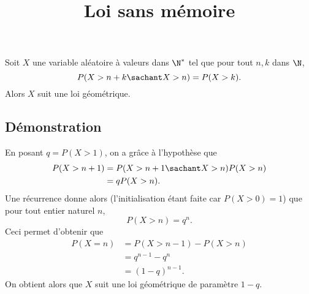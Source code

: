 \documentclass[fontsize=12pt,twoside=false,parskip=half, french]{scrartcl}
\title{Loi sans mémoire}
\date{}
\author{}
\begin{document}
\maketitle
   \begin{Theoreme}
      Soit $X$ une variable aléatoire à valeurs dans $\N^*$ tel que pour 
      tout $n, k$ dans $\N$,
      \[
         P(X > n + k \sachant X > n) = P(X > k).
      \]
      Alors $X$ suit une loi géométrique.
   \end{Theoreme}
   \subsection{Démonstration}
      En posant $q = P(X > 1)$, on a grâce à l’hypothèse que
      \begin{align*}
         P(X > n + 1) &= P(X > n + 1 \sachant X > n)P(X > n)\\ 
                      &= qP(X > n).
      \end{align*}
      Une récurrence donne alors (l’initialisation étant faite car 
      $P(X > 0) = 1$) que pour tout entier naturel $n$,
      \[
         P(X > n) = q^n.
      \]
      Ceci permet d’obtenir que
      \begin{align*}
         P(X = n) &= P(X > n - 1) - P(X > n)\\ 
                  &= q^{n -1} - q^n\\
                  &= (1 - q)^{n - 1}.
      \end{align*}
      On obtient alors que $X$ suit une loi géométrique de paramètre $1 - q$.
\end{document}
